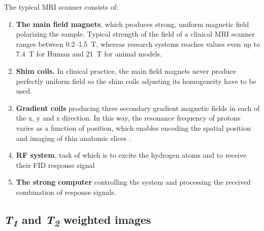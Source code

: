 The typical MRI scanner consists of:
\begin{enumerate}
\item \textbf{The main field magnets}, which produces strong, uniform magnetic field polarizing the sample. Typical strength of the field of a clinical MRI scanner ranges between 0.2--1.5\, T, whereas research systems reaches values even up to 7.4\, T for Human and 21\, T for animal models.
\newpage
\item \textbf{Shim coils.} In clinical practice, the main field magnets never produce perfectly uniform field so the shim coils adjusting its homogeneity have to be used.   
\item \textbf{Gradient coils} producing three secondary gradient magnetic fields in each of the x, y and z direction. In this way, the resonance frequency of protons varies as a function of position, which enables encoding the spatial position and imaging of thin anatomic slices \cite{hidalgo2010theory}.
\item \textbf{RF system}, task of which is to excite the hydrogen atoms and to receive their FID response signal
\item \textbf{The strong computer} controlling the system and processing the received combination of response signals.
\end{enumerate}

\subsection{\textit{T\textsubscript{1}} and \textit{T\textsubscript{2}} weighted images}

